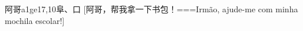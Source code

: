 \begin{EntryWithPhonetic}{阿哥}{a1ge1}{7,10}{⾩、⼝}
  [阿哥，帮我拿一下书包！===Irmão, ajude-me com minha mochila escolar!]
\end{EntryWithPhonetic}
